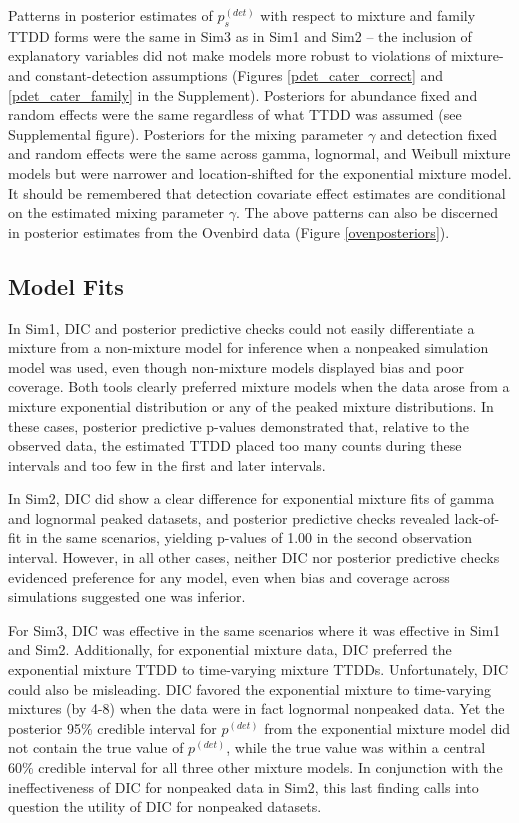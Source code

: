 \documentclass[useAMS,usenatbib,referee,12pt]{article}
\newif\ifdic   %
\newcommand{\pdet}{p^{(det)}}
\begin{document}
Patterns in posterior estimates of $\pdet_s$ with respect to mixture and family TTDD forms were the same in Sim3 as in Sim1 and Sim2 -- the inclusion of explanatory variables did not make models more robust to violations of mixture- and constant-detection assumptions (Figures \ref{pdet_cater_correct} and \ref{pdet_cater_family} in the Supplement).  
Posteriors for abundance fixed and random effects were the same regardless of what TTDD was assumed (see Supplemental figure).  
Posteriors for the mixing parameter $\gamma$ and detection fixed and random effects were the same across gamma, lognormal, and Weibull mixture models but were narrower and location-shifted for the exponential mixture model.  
It should be remembered that detection covariate effect estimates are conditional on the estimated mixing parameter $\gamma$.  
The above patterns can also be discerned in posterior estimates from the Ovenbird data (Figure \ref{ovenposteriors}).





\ifdic
\subsection{Model Fits}\label{sec:fits}

In Sim1, DIC and posterior predictive checks could not easily differentiate a mixture from a non-mixture model for inference when a nonpeaked simulation model was used, even though non-mixture models displayed bias and poor coverage.
Both tools clearly preferred mixture models when the data arose from a mixture exponential distribution or any of the peaked mixture distributions. 
In these cases, posterior predictive p-values demonstrated that, relative to the observed data, the estimated TTDD placed too many counts during these intervals and too few in the first and later intervals.

In Sim2, DIC did show a clear difference for exponential mixture fits of gamma and lognormal peaked datasets, and posterior predictive checks revealed lack-of-fit in the same scenarios, yielding p-values of 1.00 in the second observation interval.
However, in all other cases, neither DIC nor posterior predictive checks evidenced preference for any model, even when bias and coverage across simulations suggested one was inferior.  

For Sim3, DIC was effective in the same scenarios where it was effective in Sim1 and Sim2.  
Additionally, for exponential mixture data, DIC preferred the exponential mixture TTDD to time-varying mixture TTDDs.  
Unfortunately, DIC could also be misleading.  
DIC favored the exponential mixture to time-varying mixtures (by 4-8) when the data were in fact lognormal nonpeaked data.  
Yet the posterior 95\% credible interval for $\pdet$ from the exponential mixture model did not contain the true value of $\pdet$, while the true value was within a central 60\% credible interval for all three other mixture models.  
In conjunction with the ineffectiveness of DIC for nonpeaked data in Sim2, this last finding calls into question the utility of DIC for nonpeaked datasets.
\end{document}
